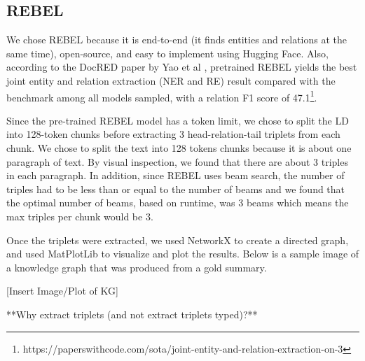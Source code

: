 \subsection*{REBEL}
We chose REBEL because it is end-to-end (it finds entities and relations at the same time), open-source, and easy to implement using Hugging Face. 
Also, according to the DocRED paper by Yao et al \cite{yao2019DocRED}, pretrained REBEL yields the best joint entity and relation extraction (NER and RE) 
result compared with the benchmark among all models sampled, with a relation F1 score of 47.1\footnote{https://paperswithcode.com/sota/joint-entity-and-relation-extraction-on-3}.

Since the pre-trained REBEL model has a token limit, we chose to split the LD into 128-token chunks before extracting 3 head-relation-tail triplets from each chunk. 
We chose to split the text into 128 tokens chunks because it is about one paragraph of text. By visual inspection, we found that there are about 3 triples in each paragraph.
In addition, since REBEL uses beam search, the number of triples had to be less than or equal to the number of beams and we found that the optimal number of beams, based
on runtime, was 3 beams which means the max triples per chunk would be 3.

Once the triplets were extracted, we used NetworkX to create a directed graph, and used MatPlotLib to visualize and plot the results. Below is a sample image of a
knowledge graph that was produced from a gold summary.

[Insert Image/Plot of KG]


**Why extract triplets (and not extract triplets typed)?**